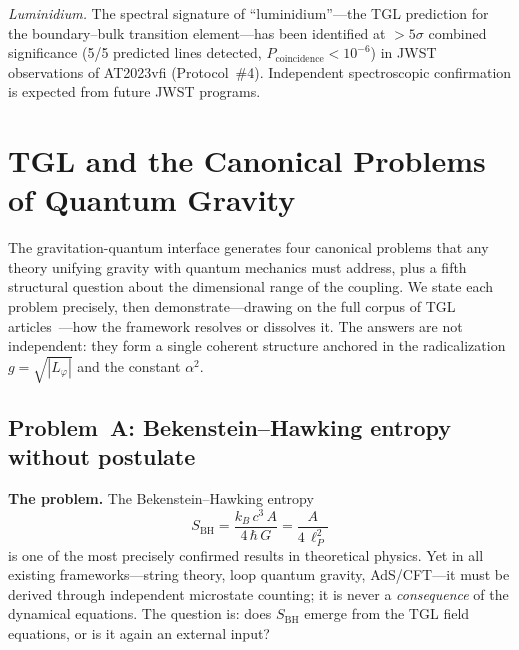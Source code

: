 \documentclass[12pt,a4paper,twocolumn]{article}
\newcommand{\alphaii}{\alpha^{2}}
\begin{document}
\textit{Luminidium.} The spectral signature of ``luminidium''---the TGL prediction for the boundary--bulk transition element---has been identified at $> 5\sigma$ combined significance (5/5 predicted lines detected, $P_{\text{coincidence}} < 10^{-6}$) in JWST observations of AT2023vfi (Protocol~\#4). Independent spectroscopic confirmation is expected from future JWST programs.



\section{TGL and the Canonical Problems of Quantum Gravity}
\label{sec:quantum_gravity}

The gravitation-quantum interface generates four canonical problems that any 
theory unifying gravity with quantum mechanics must address, plus a fifth 
structural question about the dimensional range of the coupling. We state each 
problem precisely, then demonstrate---drawing on the full corpus of TGL 
articles~\cite{Miguel2026Fronteira}---how the framework resolves or 
dissolves it. The answers are not independent: they form a single coherent 
structure anchored in the radicalization $g = \sqrt{|L_\varphi|}$ and the 
constant $\alphaii$.

\subsection{Problem~A: Bekenstein--Hawking entropy without postulate}
\label{sec:problem_a}

\textbf{The problem.} The Bekenstein--Hawking entropy
\begin{equation}
S_{\text{BH}} = \frac{k_B\,c^3\,A}{4\,\hbar\,G} = \frac{A}{4\,\ell_P^2}
\label{eq:BH}
\end{equation}
is one of the most precisely confirmed results in theoretical physics. Yet in 
all existing frameworks---string theory, loop quantum gravity, AdS/CFT---it 
must be derived through independent microstate counting; it is never a 
\emph{consequence} of the dynamical equations. The question is: does 
$S_{\text{BH}}$ emerge from the TGL field equations, or is it again an 
external input?
\end{document}
